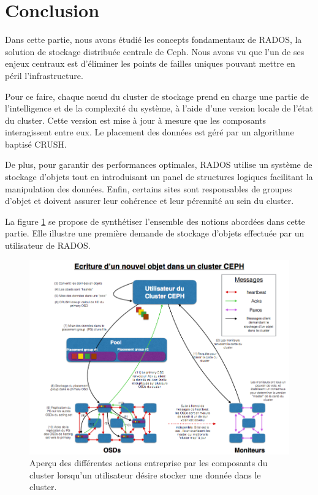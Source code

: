 \section{Conclusion}

Dans cette partie, nous avons étudié les concepts fondamentaux de RADOS, la solution de stockage distribuée centrale de Ceph. Nous avons vu que l'un de ses enjeux centraux est d'éliminer les points de failles uniques pouvant mettre en péril l'infrastructure. 

Pour ce faire, chaque nœud du cluster de stockage prend en charge une partie de l'intelligence et de la complexité du système, à l'aide d'une version locale de l'état du cluster. Cette version est mise à jour à mesure que les composants interagissent entre eux. Le placement des données est géré par un algorithme baptisé CRUSH. 

De plus, pour garantir des performances optimales, RADOS utilise un système de stockage d'objets tout en introduisant un panel de structures logiques facilitant la manipulation des données. Enfin, certains sites sont responsables de groupes d'objet et doivent assurer leur cohérence et leur pérennité au sein du cluster. 

La figure \ref{chap2:dataFlow} se propose de synthétiser l'ensemble des notions abordées dans cette partie. Elle illustre une première demande de stockage d'objets effectuée par un utilisateur de RADOS.

\hspace*{-2in}
\begin{figure}[h]
    \centering
    \includegraphics[scale=.5]{./images/dataFlow.png}
    \caption{Aperçu des différentes actions entreprise par les composants du cluster lorsqu'un utilisateur désire stocker une donnée dans le cluster.	}
    \label{chap2:dataFlow}
\end{figure}